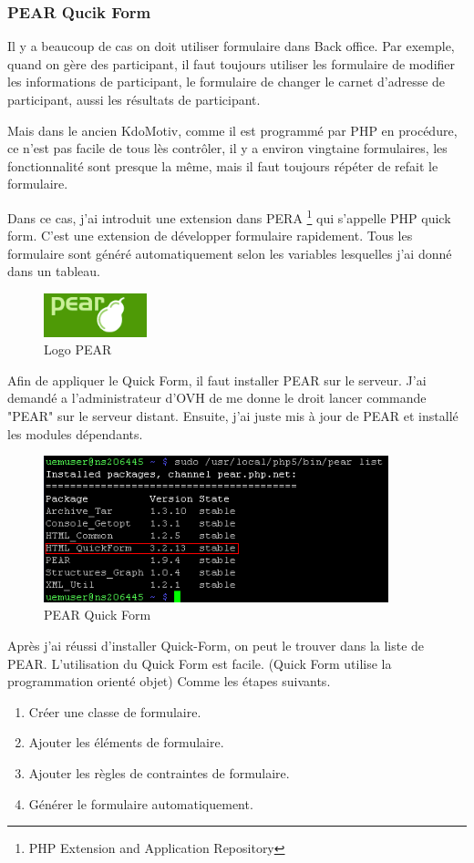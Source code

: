 \subsubsection{PEAR Qucik Form}
Il y a beaucoup de cas on doit utiliser formulaire dans Back office.
Par exemple, quand on gère  des participant, il faut toujours utiliser les formulaire de modifier les informations de participant, le formulaire de changer le carnet d'adresse de participant, aussi les résultats de participant. 

Mais dans le ancien KdoMotiv, comme il est programmé par PHP en procédure, ce n'est pas facile de tous lès contrôler, il y a environ vingtaine formulaires, les fonctionnalité sont presque la même, mais il faut toujours répéter de refait le formulaire.

Dans ce cas, j'ai introduit une extension dans PERA \footnote{PHP Extension and Application Repository} qui s'appelle PHP quick form. C'est une extension de développer formulaire rapidement. Tous les formulaire sont généré automatiquement selon les variables lesquelles j'ai donné dans un tableau. 

\begin{figure}[hbtp]
\center
\includegraphics[width=3cm]{body/images/pear_logo.png}
\caption{Logo PEAR}
\end{figure}


Afin de appliquer le Quick Form, il faut installer PEAR sur le serveur. J'ai demandé a l'administrateur d'OVH de me donne le droit lancer commande "PEAR" sur le serveur distant. Ensuite, j'ai juste mis à jour de PEAR et installé  les modules dépendants. 

\begin{figure}[hbtp]
\center
\includegraphics[width=10cm]{body/images/pear_quickform.png}
\caption{PEAR Quick Form}
\end{figure}

Après j'ai réussi d'installer Quick-Form, on peut le trouver dans la liste de PEAR. L'utilisation du Quick Form est facile. (Quick Form utilise la programmation orienté objet) Comme les étapes suivants.
\begin{enumerate}
\item Créer une classe de formulaire.
\item Ajouter les éléments de formulaire.
\item Ajouter les règles de contraintes de formulaire.
\item Générer le formulaire automatiquement. 
\end{enumerate}

